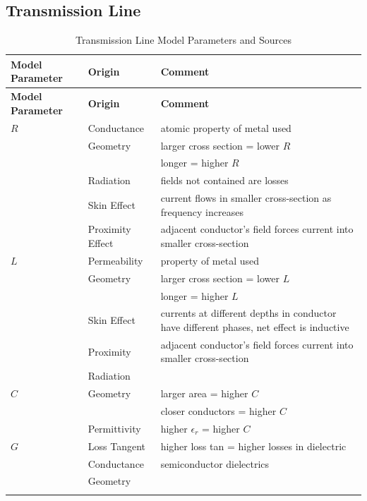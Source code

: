         \subsection{Transmission Line}
            \begin{longtable}{|m{} p{} p{}|}
                \hline
                \textbf{Model Parameter} & \textbf{Origin} & \textbf{Comment} \\\hline
                \endfirsthead
                \hline
                \textbf{Model Parameter} & \textbf{Origin} & \textbf{Comment} \\\hline
                \endhead
                \hline
                \endfoot
                \endlastfoot

                $R$ & Conductance & atomic property of metal used \\
                    & Geometry & larger cross section = lower $R$ \\
                    & & longer = higher $R$ \\
                    & Radiation & fields not contained are losses \\
                    & Skin Effect & current flows in smaller cross-section as frequency increases \\
                    & Proximity Effect & adjacent conductor's field forces current into smaller cross-section \\\hline

                $L$ & Permeability & property of metal used \\
                    & Geometry & larger cross section = lower $L$ \\
                    & & longer = higher $L$ \\
                    & Skin Effect & currents at different depths in conductor have different phases, net effect is inductive \\
                    & Proximity & adjacent conductor's field forces current into smaller cross-section \\
                    & Radiation & \\\hline

                $C$ & Geometry & larger area = higher $C$ \\
                    & & closer conductors = higher $C$ \\
                    & Permittivity & higher $\epsilon_r$ = higher $C$ \\\hline

                $G$ & Loss Tangent & higher loss tan = higher losses in dielectric \\
                    & Conductance & semiconductor dielectrics \\
                    & Geometry & \\\hline
                
                \caption{Transmission Line Model Parameters and Sources}
            \end{longtable}
            




